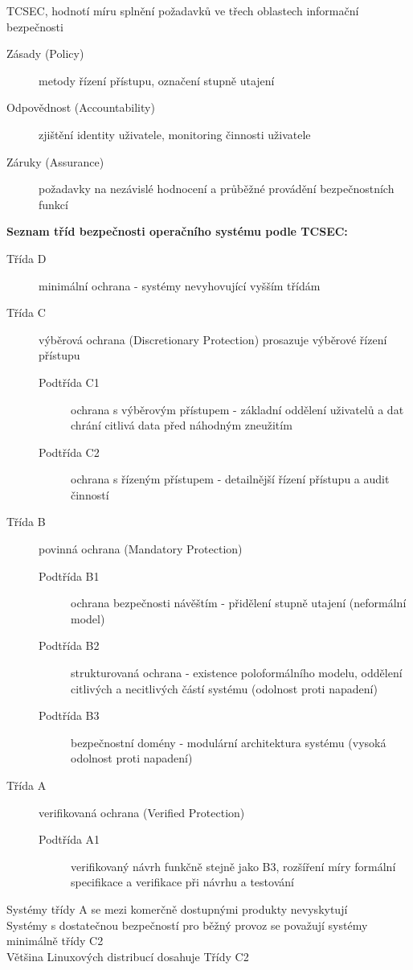 \documentclass[a4paper,12pt]{article}
\renewcommand{\b}[1]{\textbf{#1}} %
\begin{document}
\vspace{4 mm}
TCSEC, hodnotí míru splnění požadavků ve třech oblastech informační bezpečnosti~\cite{PrezentaceBIS}
\begin{description}
 \item[Zásady (Policy)] metody řízení přístupu, označení stupně utajení
 \item[Odpovědnost (Accountability)] zjištění identity uživatele, monitoring činnosti uživatele
 \item[Záruky (Assurance)] požadavky na nezávislé hodnocení a průběžné provádění bezpečnostních funkcí
 \end{description}
\b{Seznam tříd bezpečnosti operačního systému podle TCSEC:}
\begin{description}
\item[Třída D] minimální ochrana - systémy nevyhovující vyšším třídám
\item[Třída C] výběrová ochrana (Discretionary Protection) prosazuje výběrové řízení přístupu
\begin{description}
\item[Podtřída C1] ochrana s výběrovým přístupem - základní oddělení uživatelů a dat chrání citlivá data před náhodným zneužitím
\item[Podtřída C2] ochrana  s řízeným přístupem - detailnější řízení přístupu a audit činností
\end{description}
\item[Třída B] povinná ochrana (Mandatory Protection)
\begin{description}
\item[Podtřída B1] ochrana bezpečnosti návěštím - přidělení stupně utajení (neformální model)
\item[Podtřída B2] strukturovaná ochrana - existence poloformálního modelu, oddělení citlivých a necitlivých částí systému (odolnost proti napadení)
\item[Podtřída B3] bezpečnostní domény - modulární architektura systému (vysoká odolnost proti napadení)
\end{description}
\item[Třída A] verifikovaná ochrana (Verified Protection)
\begin{description}
\item[Podtřída A1] verifikovaný návrh funkčně stejně jako B3, rozšíření míry formální specifikace a verifikace při návrhu a testování 
\end{description}
\end{description}
Systémy třídy A se mezi komerčně dostupnými produkty nevyskytují\\
Systémy s dostatečnou bezpečností pro běžný provoz se považují systémy minimálně třídy C2~\cite{PrezentaceBIS}\\
Většina Linuxových distribucí dosahuje Třídy C2~\cite{LinuxDictionary}
\end{document}
